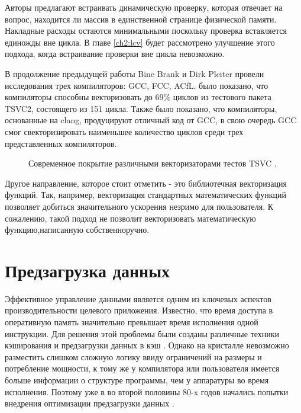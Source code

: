 Авторы предлагают встраивать динамическую проверку, которая  отвечает на вопрос, находится ли массив в единственной странице физической памяти. Накладные расходы остаются минимальными поскольку проверка вставляется единожды вне цикла. В главе \ref{ch2:lcv} будет рассмотрено улучшение этого подхода, когда встраивание проверки вне цикла невозможно.
 
В продолжение предыдущей работы Bine Brank и Dirk Pleiter \cite{brank2022assessing} провели исследования трех компиляторов: GCC, FCC, ACfL. было показано, что компиляторы способны векторизовать до 69\% циклов из тестового пакета TSVC2, состоящего из 151 цикла. Также было показано, что компиляторы, основанные на clang, продуцируют отличный код от GCC, в свою очередь GCC смог свекторизировать наименьшее количество циклов среди трех представленных компиляторов.
 \begin{figure}[htbp]
 	\centering
 	
 	\caption{Современное покрытие различными векторизаторами тестов TSVC \cite{brank2022assessing}.}
 	\label{partReview:vectorization}
 \end{figure}
 
Другое направление, которое стоит отметить - это библиотечная векторизация функций. Так, например, векторизация стандартных  математических функций \cite{petrogalli2018llvm} позволяет добиться значительного ускорения незримо для пользователя. К сожалению, такой подход не позволит векторизовать математическую функцию,написанную собственноручно.
 
 
\section{Предзагрузка данных} \label{pr:prefetch}
Эффективное управление данными является одним из ключевых аспектов производительности целевого приложения. Известно, что время доступа в оперативную память значительно превышает время исполнения одной инструкции. Для решения этой проблемы были созданы различные техники кэширования и предзагрузки данных в кэш \cite{smith1987design, tse1998cpu}.  Однако на кристалле невозможно разместить слишком сложную логику ввиду ограничений на размеры и потребление мощности, к тому же у компилятора или пользователя имеется больше информации о структуре программы, чем у аппаратуры во время исполнения. Поэтому уже в во второй половины 80-x годов начались попытки внедрения оптимизации предзагрузки данных \cite{lee1987effectiveness}. 


